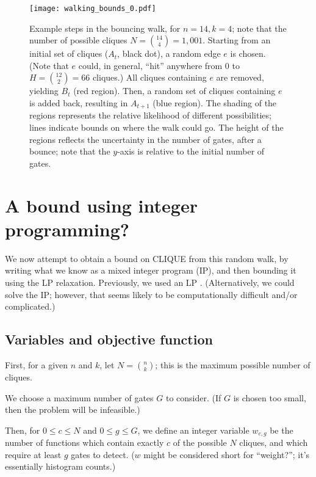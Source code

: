 \documentclass[12pt]{article}
\theoremstyle{definition}
\begin{document}
\begin{figure}

\centering

\texttt{[image: walking\_bounds\_0.pdf]}

\caption{
Example steps in the bouncing walk, for $n=14, k=4$; 
note that the number of possible cliques $N = {14 \choose 4} = 1,001$.
 Starting from an initial set of cliques ($A_t$, black dot),
a random edge $e$ is chosen. (Note that $e$ could, in general,
``hit'' anywhere from 0 to $H = {12 \choose 2} = 66$ cliques.)
 All cliques containing $e$ are removed, yielding $B_t$ (red region).
Then, a random set of cliques containing $e$ is added back, resulting in $A_{t+1}$ (blue region).
The shading of the regions represents the relative likelihood of different possibilities;
lines indicate bounds on where the walk could go.
The height of the regions reflects the uncertainty in the number
of gates, after a bounce; note that the $y$-axis is relative to the initial number of gates.
}
\label{fig:walk}

\end{figure}


\section{A bound using integer programming?}

We now attempt to obtain a bound on CLIQUE from this random walk, by
writing what we know as a mixed integer program (IP), and then bounding it
using the LP relaxation. Previously, we used an LP \cite{buggyclique}.
(Alternatively, we could solve the IP; however, that seems likely to
be computationally difficult and/or complicated.)

\subsection{Variables and objective function}

First, for a given $n$ and $k$, let $N = {n \choose k}$; this is
the maximum possible number of cliques.

We choose a maximum number of gates $G$ to consider. (If $G$ is
chosen too small, then the problem will be infeasible.)

Then, for $0 \le c \le N$ and $0 \le g \le G$,
we define an integer variable $w_{c,g}$ be the number of functions which contain
exactly $c$ of the possible $N$ cliques, and which require at least
$g$ gates to detect. ($w$ might be considered short for ``weight?'';
it's essentially histogram counts.)
\end{document}
